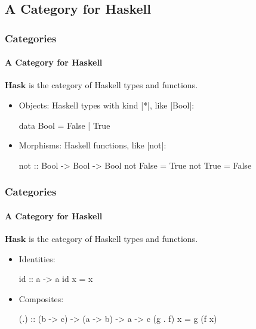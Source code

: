 \documentclass{beamer}
\newcommand{\catbf}[1]{\ensuremath{\mathbf{#1}}\xspace}
\newcommand{\hask}{\catbf{Hask}}
\begin{document}

\subsection{A Category for Haskell}


\begin{frame}[fragile,label={ex:hask}]
  \frametitle{Categories}
  \framesubtitle{A Category for Haskell}

  \begin{example}
    \hask is the category of Haskell types and functions.
    \begin{itemize}
    \item
      Objects: Haskell types with kind |*|, like |Bool|:
      \begin{code}
data Bool = False | True
      \end{code}
    \item
      Morphisms: Haskell functions, like |not|:
      \begin{code}
not :: Bool -> Bool -> Bool
not False = True
not True  = False
      \end{code}
    \end{itemize}
  \end{example}
  \vfill\hfill\hyperlink{re:hask}{\beamergotobutton{}}

\end{frame}


\begin{frame}[fragile]
  \frametitle{Categories}
  \framesubtitle{A Category for Haskell}

  \begin{example}
    \hask is the category of Haskell types and functions.
    \begin{itemize}
    \item
      Identities:
      \begin{code}
id :: a -> a
id x = x
      \end{code}
    \item
      Composites:
      \begin{code}
(.) :: (b -> c) -> (a -> b) -> a -> c
(g . f) x = g (f x)
      \end{code}
    \end{itemize}
  \end{example}

\end{frame}
\end{document}
